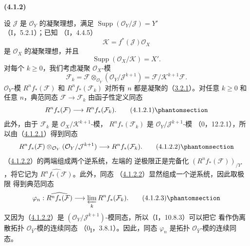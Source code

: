 \documentclass[UTF8,fontset=none,11pt,oneside,openany]{ctexbook}
\newenvironment{env}[1][]{%
  \par\medskip\noindent\textbf{(#1)}\ %
}{\par}
\let\EGAOriginalLabel\label
\renewcommand{\label}[1]{\phantomsection\EGAOriginalLabel{#1}}
\begin{document}
\begin{env}[4.1.2]
\label{III.4.1.2-fr}
设 $\mathcal J$ 是 $\mathcal O_Y$ 的凝聚理想，满足
$\operatorname{Supp}(\mathcal O_Y/\mathcal J)=Y'$（I，5.2.1）；已知
（I，4.4.5）
\[
\mathcal K=f^*(\mathcal J)\mathcal O_X
\]
是 $\mathcal O_X$ 的凝聚理想，并且
\[
\operatorname{Supp}(\mathcal O_X/\mathcal K)=X'.
\]
对每个 $k\geq0$，我们考虑凝聚 $\mathcal O_X$-模
\[
\mathcal F_k
=\mathcal F\otimes_{\mathcal O_Y}(\mathcal O_Y/\mathcal J^{k+1})
=\mathcal F/\mathcal K^{k+1}\mathcal F.
\]
$\mathcal O_Y$-模 $R^nf_*(\mathcal F)$ 和 $R^nf_*(\mathcal F_k)$
对所有 $n$ 都是凝聚的（\hyperref[III.3.2.1-fr]{3.2.1}）。对任意
$k\geq0$ 和任意 $n$，典范同态 $\mathcal F\to\mathcal F_k$
由函子性定义同态
\[
R^nf_*(\mathcal F)\longrightarrow R^nf_*(\mathcal F_k).
\tag{4.1.2.1}\label{III.4.1.2.1-fr}
\]
此外，由于 $\mathcal F_k$ 是 $\mathcal O_X/\mathcal K^{k+1}$-模，
$R^nf_*(\mathcal F_k)$ 是 $\mathcal O_Y/\mathcal J^{k+1}$-模
（0，12.2.1），所以由（\hyperref[III.4.1.2.1-fr]{4.1.2.1}）得到同态
\[
R^nf_*(\mathcal F)\otimes_{\mathcal O_Y}
(\mathcal O_Y/\mathcal J^{k+1})
\longrightarrow R^nf_*(\mathcal F_k).
\tag{4.1.2.2}\label{III.4.1.2.2-fr}
\]
（\hyperref[III.4.1.2.2-fr]{4.1.2.2}）的两端组成两个逆系统，左端的
逆极限正是完备化 $(R^nf_*(\mathcal F))_{/Y'}$，将它记为
$\widehat{R^nf_*(\mathcal F)}$。此外，同态
（\hyperref[III.4.1.2.2-fr]{4.1.2.2}）显然组成一个逆系统，因此取极限
得到典范同态
\[
\varphi_n:\widehat{R^nf_*(\mathcal F)}
\longrightarrow\varprojlim_kR^nf_*(\mathcal F_k).
\tag{4.1.2.3}\label{III.4.1.2.3-fr}
\]
又因为（\hyperref[III.4.1.2.2-fr]{4.1.2.2}）是
$(\mathcal O_Y/\mathcal J^{k+1})$-模同态，所以（I，10.8.3）可以把它
看作伪离散拓扑 $\mathcal O_{\widehat Y}$-模的连续同态
（0\textsubscript{I}，3.8.1）。因此，同态 $\varphi_n$ 是拓扑
$\mathcal O_{\widehat Y}$-模的连续同态。
\end{env}
\end{document}
